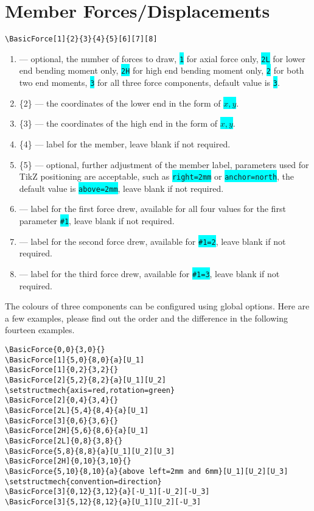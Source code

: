 \documentclass[10pt,a4paper]{article}
\newcommand*{\Highlight}[1]{\colorbox{cyan}{\color{red}\texttt{#1}}}
\begin{document}
\section{Member Forces/Displacements}
\begin{Verbatim}[frame=single,label=Syntax]
\BasicForce[1]{2}{3}{4}{5}[6][7][8]
\end{Verbatim}
\begin{enumerate}
\item[][1] --- optional, the number of forces to draw, \Highlight{1} for axial force only, \Highlight{2L} for lower end bending moment only, \Highlight{2H} for high end bending moment only, \Highlight{2} for both two end moments, \Highlight{3} for all three force components, default value is \Highlight{3}.
\item[]\{2\} --- the coordinates of the lower end in the form of \Highlight{$x,y$}.
\item[]\{3\} --- the coordinates of the high end in the form of \Highlight{$x,y$}.
\item[]\{4\} --- label for the member, leave blank if not required.
\item[]\{5\} --- optional, further adjustment of the member label, parameters used for TikZ positioning are acceptable, such as \Highlight{right=2mm} or \Highlight{anchor=north}, the default value is \Highlight{above=2mm}, leave blank if not required.
\item[][6] --- label for the first force drew, available for all four values for the first parameter \Highlight{\#1}, leave blank if not required.
\item[][7] --- label for the second force drew, available for \Highlight{\#1=2}, leave blank if not required.
\item[][8] --- label for the third force drew, available for \Highlight{\#1=3}, leave blank if not required.
\end{enumerate}
The colours of three components can be configured using global options. Here are a few examples, please find out the order and the difference in the following fourteen examples.
\begin{Verbatim}[frame=single,label=Example]
\BasicForce{0,0}{3,0}{}
\BasicForce[1]{5,0}{8,0}{a}[U_1]
\BasicForce[1]{0,2}{3,2}{}
\BasicForce[2]{5,2}{8,2}{a}[U_1][U_2]
\setstructmech{axis=red,rotation=green}
\BasicForce[2]{0,4}{3,4}{}
\BasicForce[2L]{5,4}{8,4}{a}[U_1]
\BasicForce[3]{0,6}{3,6}{}
\BasicForce[2H]{5,6}{8,6}{a}[U_1]
\BasicForce[2L]{0,8}{3,8}{}
\BasicForce{5,8}{8,8}{a}[U_1][U_2][U_3]
\BasicForce[2H]{0,10}{3,10}{}
\BasicForce{5,10}{8,10}{a}{above left=2mm and 6mm}[U_1][U_2][U_3]
\setstructmech{convention=direction}
\BasicForce[3]{0,12}{3,12}{a}[-U_1][-U_2][-U_3]
\BasicForce[3]{5,12}{8,12}{a}[U_1][U_2][-U_3]
\end{Verbatim}
\end{document}

